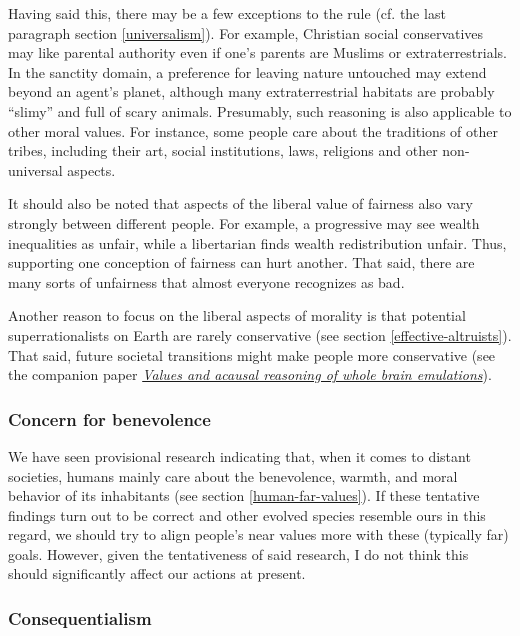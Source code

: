Having said this, there may be a few exceptions to the rule (cf. the
last paragraph section \ref{universalism}). For example,
Christian social conservatives may like parental authority even if one's
parents are Muslims or extraterrestrials. In the sanctity domain, a
preference for leaving nature untouched may extend beyond an agent's
planet, although many extraterrestrial habitats are probably ``slimy''
and full of scary animals. Presumably, such reasoning is also applicable
to other moral values. For instance, some people care about the
traditions of other tribes, including their art, social institutions,
laws, religions and other non-universal aspects.

It should also be noted that aspects of the liberal value of fairness also vary strongly
between different people. For example, a progressive may see
wealth inequalities as unfair, while a libertarian finds wealth redistribution unfair. Thus,
supporting one conception of fairness can hurt another. That said, there are many
sorts of unfairness that almost everyone recognizes as bad.

Another reason to focus on the liberal aspects of morality is that
potential superrationalists on Earth are rarely conservative (see
section \ref{effective-altruists}). That said, future societal transitions might make people
more conservative (see the companion paper \href{https://foundational-research.org/files/Whole-brain-emulation.pdf}{\emph{Values and acausal reasoning of whole brain emulations}}).

\subsubsection{Concern for benevolence}\label{concern-for-benevolence}

We have seen provisional research indicating that, when it comes to
distant societies, humans mainly care about the benevolence, warmth, and
moral behavior of its inhabitants (see section
\ref{human-far-values}). If
these tentative findings turn out to be correct and other evolved
species resemble ours in this regard, we should try to align people's
near values more with these (typically far) goals. However, given the
tentativeness of said research, I do not think this should significantly
affect our actions at present.

\subsubsection{Consequentialism}\label{consequentialism-1}

